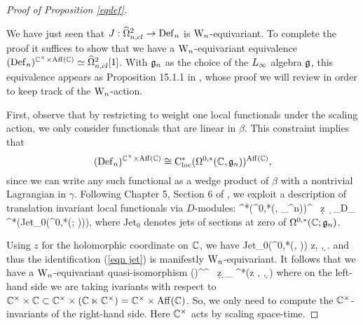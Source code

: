 \begin{proof}[Proof of Proposition \ref{eqdef}]
\label{seceqdef}

We have just seen that $J : \widehat{\Omega}^2_{n,cl} \to {\rm Def}_n$ is
${{\rm W}_n}$-equivariant. To complete the proof it suffices to show that we have a ${{\rm W}_n}$-equivariant equivalence $({\rm Def}_n)^{\mathbb C^\times \times {\rm
    Aff}(\mathbb C)} \simeq \widehat{\Omega}^2_{n,cl}[1]$. With $\mathfrak{g}_n$ as the choice of the $\L8$ algebra $\mathfrak g$, 
this equivalence appears as Proposition 15.1.1 in \cite{WG2},
whose proof we will review in order to keep track of the ${{\rm W}_n}$-action. 

First, observe that by restricting to weight one local functionals under the scaling action, 
we only consider functionals that are linear in $\beta$.
This constraint implies that 
\[
({\rm Def}_n)^{\mathbb C^\times \times {\rm Aff}(\mathbb C)} \cong {\rm C}^*_{\rm loc}(\Omega^{0,*}(\mathbb C, \mathfrak{g}_n))^{{\rm Aff}(\mathbb C)},
\] 
since we can write any such functional as a wedge product of $\beta$ with a nontrivial Lagrangian in $\gamma$.
Following Chapter 5, Section 6 of \cite{CosBook}, we exploit a
description of translation invariant local functionals via $D$-modules:
\be\label{eqn jet}
\Cloc^*\left(\Omega^{0,*}(\CC, \fg_{\hD^n})\right)^\CC 
\cong \CC \, \d z \, \d \zbar \otimes_{D_{\CC}} \Cred^*\left({\rm Jet}_0(\Omega^{0,*}(\CC ; \fgn))\right),
\ee
where $\text{Jet}_0$ denotes jets of sections at zero of
$\Omega^{0,*}(\mathbb C ; \mathfrak g_n)$. 

Using $z$ for the holomorphic coordinate on $\mathbb C$, we have
\ben
{\rm Jet}_0(\Omega^{0,*}(\CC, \fgn)) \cong \fgn \llbracket z, \zbar, \d \zbar \rrbracket.
\een 
and thus the identification (\ref{eqn jet}) is manifestly ${{\rm W}_n}$-equivariant. 
It follows that we have a ${{\rm W}_n}$-equivariant quasi-isomorphism
\ben
(\Def)^{\CC^\times \times \CC} \simeq \CC\, \d z \wedge \d \zbar \otimes_{} \Cred^*(\fgn\llbracket z , \zbar, \d \zbar \rrbracket)
\een
where on the left-hand side we are taking ivariants with respect to $\mathbb C^\times \times \mathbb C \subset \mathbb C^\times \times (\mathbb C \ltimes \mathbb C^\times) = \mathbb C^\times \times {\rm Aff}(\mathbb C)$. So, we only need to compute the $\mathbb C^\times$-invariants of the right-hand side. Here $\mathbb C^\times$ acts by scaling space-time.


\end{proof}
